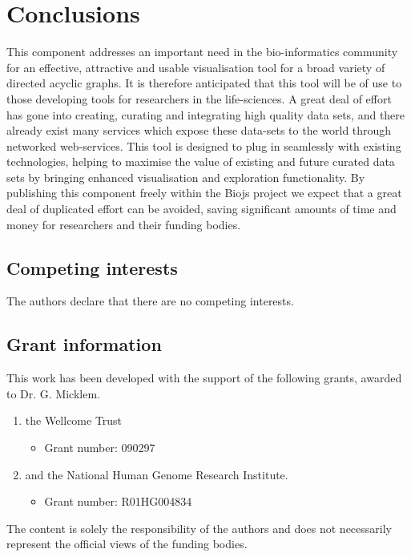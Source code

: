 \documentclass[10pt,a4paper,twocolumn]{article}
\begin{document}
\section*{Conclusions} This component addresses an important need in the
bio-informatics community for an effective, attractive and usable visualisation
tool for a broad variety of directed acyclic graphs.  It is therefore
anticipated that this tool will be of use to those developing tools for
researchers in the life-sciences. A great deal of effort has gone into creating,
curating and integrating high quality data sets, and there already exist many
services which expose these data-sets to the world through networked
web-services. This tool is designed to plug in seamlessly with existing
technologies, helping to maximise the value of existing and future curated data
sets by bringing enhanced visualisation and exploration functionality.  By
publishing this component freely within the Biojs project we expect that a great
deal of duplicated effort can be avoided, saving significant amounts of time and
money for researchers and their funding bodies.

\subsection*{Competing interests}
The authors declare that there are no competing interests.

\subsection*{Grant information}
This work has been developed with the support of the following grants, awarded
to Dr. G. Micklem.

\begin{enumerate}
\item the Wellcome Trust
 \begin{itemize}
 \item{Grant number: 090297}
 \end{itemize}
\item and the National Human Genome Research Institute.
 \begin{itemize}
 \item{Grant number: R01HG004834}
 \end{itemize}
\end{enumerate}

The content is solely the responsibility of the authors and does not necessarily
represent the official views of the funding bodies.
\end{document}

